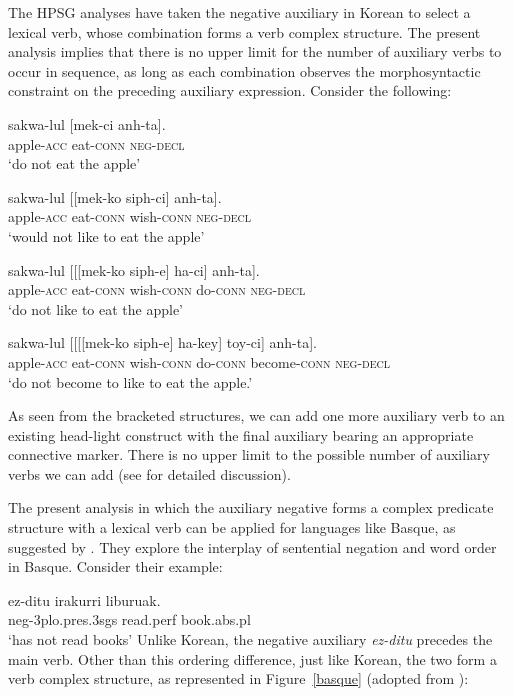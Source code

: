 \documentclass[output=paper
                ,modfonts
                		,nonflat
	        ,collection
	        ,collectionchapter
	        ,collectiontoclongg
 	        ,biblatex
                ,babelshorthands
                ,newtxmath
                ,draftmode
                ,colorlinks, citecolor=brown
]{./langsci/langscibook}
\begin{document}
{\begin{exe}
\begin{xlist}
The HPSG analyses have taken the negative auxiliary in Korean
to select a lexical verb, whose combination forms a verb complex
structure. The present analysis implies that there is no upper limit for the
number of auxiliary verbs to
occur in sequence, as long as each combination observes
the morphosyntactic constraint on the preceding auxiliary expression. Consider
the following:

\eal\ex \gll sakwa-lul [mek-ci anh-ta]. \\
apple-\textsc{acc} eat-\textsc{conn} \textsc{neg}-\textsc{decl} \\
\trans`do not eat the apple'

\ex \gll sakwa-lul [[mek-ko siph-ci] anh-ta]. \\
apple-\textsc{acc} eat-\textsc{conn} wish-\textsc{conn} \textsc{neg}-\textsc{decl} \\
\trans`would not like to eat the apple'

\ex \label{20c} \gll sakwa-lul [[[mek-ko siph-e] ha-ci] anh-ta]. \\
apple-\textsc{acc} eat-\textsc{conn} wish-\textsc{conn} do-\textsc{conn} \textsc{neg}-\textsc{decl} \\
\trans`do not like to eat the apple'

\ex \gll sakwa-lul [[[[mek-ko siph-e] ha-key] toy-ci] anh-ta]. \\
apple-\textsc{acc} eat-\textsc{conn} wish-\textsc{conn} do-\textsc{conn} become-\textsc{conn} \textsc{neg}-\textsc{decl} \\
\trans`do not become to like to eat the apple.'
\end{xlist} \end{exe}
%
As seen from the bracketed structures, we can add one more auxiliary verb to
an existing head-light construct with the final auxiliary bearing an appropriate
  connective marker. There is no upper limit to the possible number  of auxiliary
  verbs we can add (see \citealt{Kim:16} for detailed discussion).

The present analysis in which the auxiliary negative forms a complex
predicate structure with a lexical verb can be applied for languages
like Basque, as suggested by \citet{CB:11}. They explore the interplay of sentential
negation and word order in Basque. Consider their example:

\ea
\label{basque-ex}
\gll ez-ditu irakurri liburuak. \\
     {\sc neg}-3{\sc plo.pres.3sgs} read.{\sc perf} book.{\sc abs.pl}\\
\glt `has not read books'
\z
%
%
Unlike Korean, the negative auxiliary \textit{ez-ditu} precedes
the main verb. Other than this ordering difference, just
like Korean, the two form a verb complex structure, as represented in
Figure~\ref{basque} (adopted from \citealt{CB:11}):

}
\end{document}
